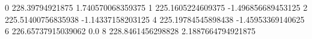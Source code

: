 0 228.39794921875 1.740570068359375
1 225.1605224609375 -1.496856689453125
2 225.51400756835938 -1.14337158203125
4 225.19784545898438 -1.45953369140625
6 226.65737915039062 0.0
8 228.8461456298828 2.1887664794921875
